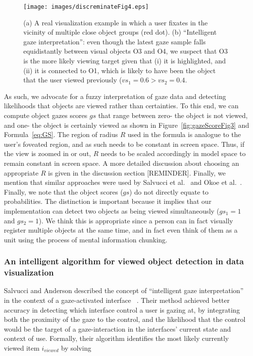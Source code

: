 \begin{figure}[htb]
  \centering
  \texttt{[image: images/discreminateFig4.eps]}
  \caption{(a) A real visualization example in which a user fixates in the vicinity of multiple close object groups (red dot). (b) ``Intelligent gaze interpretation'': even though the latest gaze sample falls equidistantly between visual objects O3 and O4, we suspect that O3 is the more likely viewing target given that (i) it is highlighted, and (ii) it is connected to O1, which is likely to have been the object that the user viewed previously ($vs_1=0.6 > vs_2 = 0.4$. }
	\label{fig:discreminateFig4}
\end{figure}

As such, we advocate for a fuzzy interpretation of gaze data and detecting likelihoods that objects are viewed rather than certainties. To this end, we can compute object gazes scores $gs$ that range between zero- the object is not viewed, and one- the object is certainly viewed as shown in Figure~\ref{fig:gazeScoreFig3} and Formula~\ref{eq:GS}. The region of radius $R$ used in the formula is analogue to the user's foveated region, and as such needs to be constant in screen space. Thus, if the view is zoomed in or out, $R$ needs to be scaled accordingly in model space to remain constant in screen space.  A more detailed discussion about choosing an appropriate $R$ is given in the discussion section [REMINDER]. Finally, we mention that similar approaches were used by Salvucci et al.~\cite{salvucci2000intelligent} and Okoe et al.~\cite{okoe2014gaze}.
Finally, we note that the object scores ($gs$) do not directly equate to probabilities. The distinction is important because it implies that our implementation can detect two objects as being viewed simultaneously ($gs_1 = 1$ and $gs_2=1$). We think this is appropriate since a person can in fact visually register multiple objects at the same time, and in fact even think of them as a unit using the process of mental information chunking.


\subsubsection{An intelligent algorithm for viewed object detection in data visualization}
\label{sec:MehthodsIntelligentAlgorithm}
Salvucci and Anderson described the concept of ``intelligent gaze interpretation'' in the context of a gaze-activated interface ~\cite{salvucci2000intelligent}. Their method achieved better accuracy in detecting which interface control a user is gazing at, by integrating both the proximity of the gaze to the control, and the likelihood that the control would be the target of a gaze-interaction in the interfaces' current state and context of use. Formally, their algorithm identifies the most likely currently viewed item $i_{viewed}$ by solving 

